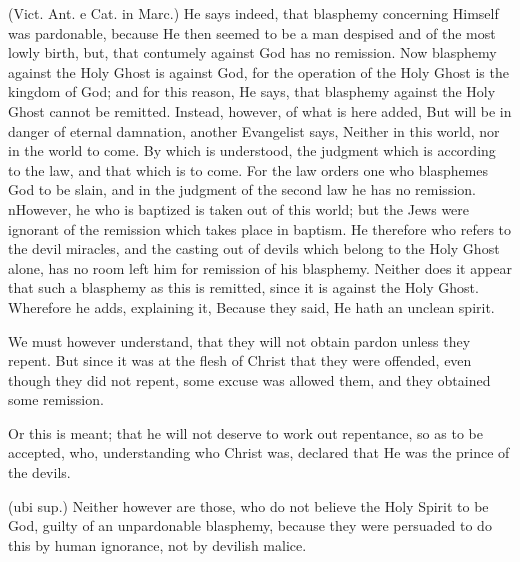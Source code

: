  (Vict. Ant. e Cat. in Marc.) He says indeed, that blasphemy concerning Himself was pardonable, because He then seemed to be a man despised and of the most lowly birth, but, that contumely against God has no remission. Now blasphemy against the Holy Ghost is against God, for the operation of the Holy Ghost is the kingdom of God; and for this reason, He says, that blasphemy against the Holy Ghost cannot be remitted. Instead, however, of what is here added, But will be in danger of eternal damnation, another Evangelist says, Neither in this world, nor in the world to come. By which is understood, the judgment which is according to the law, and that which is to come. For the law orders one who blasphemes God to be slain, and in the judgment of the second law he has no remission. nHowever, he who is baptized is taken out of this world; but the Jews were ignorant of the remission which takes place in baptism. He therefore who refers to the devil miracles, and the casting out of devils which belong to the Holy Ghost alone, has no room left him for remission of his blasphemy. Neither does it appear that such a blasphemy as this is remitted, since it is against the Holy Ghost. Wherefore he adds, explaining it, Because they said, He hath an unclean spirit.

 We must however understand, that they will not obtain pardon unless they repent. But since it was at the flesh of Christ that they were offended, even though they did not repent, some excuse was allowed them, and they obtained some remission.

 Or this is meant; that he will not deserve to work out repentance, so as to be accepted, who, understanding who Christ was, declared that He was the prince of the devils.

 (ubi sup.) Neither however are those, who do not believe the Holy Spirit to be God, guilty of an unpardonable blasphemy, because they were persuaded to do this by human ignorance, not by devilish malice.

